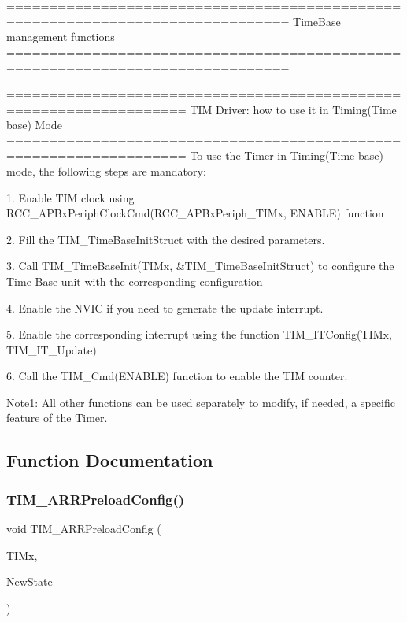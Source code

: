 \begin{DoxyVerb} ===============================================================================
                       TimeBase management functions
 ===============================================================================  
  
       ===================================================================      
              TIM Driver: how to use it in Timing(Time base) Mode
       =================================================================== 
       To use the Timer in Timing(Time base) mode, the following steps are mandatory:
       
       1. Enable TIM clock using RCC_APBxPeriphClockCmd(RCC_APBxPeriph_TIMx, ENABLE) function
                    
       2. Fill the TIM_TimeBaseInitStruct with the desired parameters.
       
       3. Call TIM_TimeBaseInit(TIMx, &TIM_TimeBaseInitStruct) to configure the Time Base unit
          with the corresponding configuration
          
       4. Enable the NVIC if you need to generate the update interrupt. 
          
       5. Enable the corresponding interrupt using the function TIM_ITConfig(TIMx, TIM_IT_Update) 
       
       6. Call the TIM_Cmd(ENABLE) function to enable the TIM counter.
             
       Note1: All other functions can be used separately to modify, if needed,
          a specific feature of the Timer. \end{DoxyVerb}
 

\subsection{Function Documentation}
\mbox{\label{group___t_i_m___group1_ga42b44b9fc2b0798d733720dd6bac1ac0}} 
\subsubsection{\texorpdfstring{T\+I\+M\+\_\+\+A\+R\+R\+Preload\+Config()}{TIM\_ARRPreloadConfig()}}
{\footnotesize\ttfamily void T\+I\+M\+\_\+\+A\+R\+R\+Preload\+Config (\begin{DoxyParamCaption}\item[{\hyperlink{struct_t_i_m___type_def}{T\+I\+M\+\_\+\+Type\+Def} $\ast$}]{T\+I\+Mx,  }\item[{Functional\+State}]{New\+State }\end{DoxyParamCaption})}



